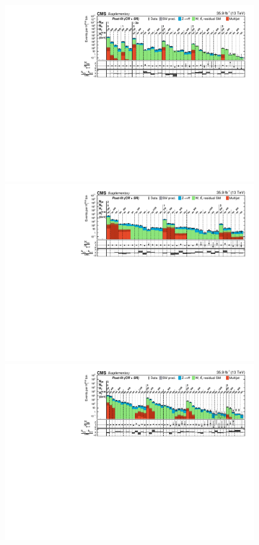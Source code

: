 \begin{figure}
    \begin{center}
            \includegraphics[width=0.98\textwidth]{Supplementary/CMS-SUS-16-038_Figure-aux_013-a}
            \includegraphics[width=0.98\textwidth]{Supplementary/CMS-SUS-16-038_Figure-aux_013-b}\\
            \includegraphics[width=0.98\textwidth]{Supplementary/CMS-SUS-16-038_Figure-aux_013-c}\\

\end{center}
\end{figure}

